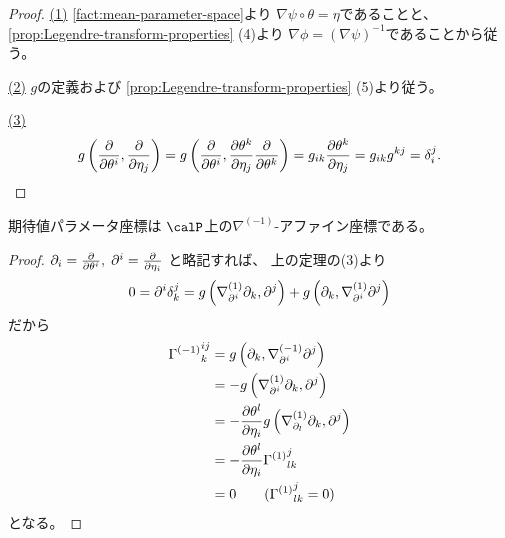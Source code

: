 \documentclass[report]{jlreq}
\begin{document}
\begin{proof}
    \uline{(1)} \quad
    \cref{fact:mean-parameter-space}より
    $\nabla \psi \circ \theta = \eta$であることと、
    \cref{prop:Legendre-transform-properties} (4)より
    $\nabla \phi = (\nabla \psi)^{-1}$であることから従う。

    \uline{(2)} \quad
    $g$の定義および
    \cref{prop:Legendre-transform-properties} (5)より従う。

    \uline{(3)} \quad
    \begin{alignat}{1}
        g\myparen{
            \deldel{\theta^i},
            \deldel{\eta_j}
        }
            =
                g\myparen{
                    \deldel{\theta^i},
                    \deldel[\theta^k]{\eta_j}
                    \deldel{\theta^k}
                }
            =
                g_{ik} \deldel[\theta^k]{\eta_j}
            =
                g_{ik} g^{kj}
            =
                \delta_i^j.
    \end{alignat}
\end{proof}

\begin{theorem}
    期待値パラメータ座標は
    $\calP$上の$\nabla^{(-1)}$-アファイン座標である。
\end{theorem}

\begin{proof}
    $\del_i = \deldel{\theta^i}, \; \del^i = \deldel{\eta_i}$
    と略記すれば、
    上の定理の(3)より
    \begin{alignat}{1}
        0
            =
                \partial^i \delta_k^j
            =
                g\left({
                    \nabla^{(1)}_{\partial^i} \partial_k,
                    \partial^j
                }\right)
                + g\left({
                    \partial_k,
                    \nabla^{(1)}_{\partial^i} \partial^j
                }\right)
    \end{alignat}
    だから
    \begin{alignat}{1}
        {\Gamma^{(-1)}}_k^{ij}
            &=
                g\myparen{
                    \del_k,
                    \nabla^{(-1)}_{\del^i} \del^j
                }
                \\
            &=
                -g\myparen{
                    \nabla^{(1)}_{\del^i} \del_k,
                    \del^j
                }
                \\
            &=
                - \deldel[\theta^l]{\eta_i}
                g\myparen{
                    \nabla^{(1)}_{\del_l} \del_k,
                    \del^j
                }
                \\
            &=
                - \deldel[\theta^l]{\eta_i}
                {\Gamma^{(1)}}_{lk}^j
                \\
            &=
                0
                \qquad
                ({\Gamma^{(1)}}_{lk}^j = 0)
    \end{alignat}
    となる。
\end{proof}
\end{document}

